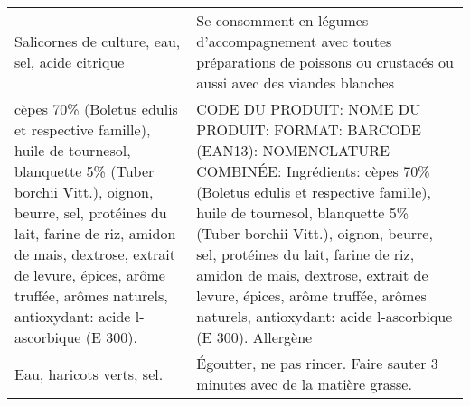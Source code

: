 \begin{longtable}{p{7cm}p{7cm}}
                                                                                                                                                                                                                                                        Salicornes de culture, eau, sel, acide citrique &                                                                                                                                                                                                                                                                                                                                          Se consomment en légumes d'accompagnement avec toutes préparations de poissons ou crustacés ou aussi avec des viandes blanches \\
        cèpes 70\% (Boletus edulis et respective famille), huile de tournesol, blanquette 5\% (Tuber borchii Vitt.), oignon, beurre, sel, protéines du lait, farine de riz, amidon de mais, dextrose, extrait de levure, épices, arôme truffée, arômes naturels, antioxydant: acide l-ascorbique (E 300). &  CODE DU PRODUIT:  \newline NOME DU PRODUIT:  \newline FORMAT:  \newline BARCODE (EAN13):  \newline NOMENCLATURE COMBINÉE:  \newline   \newline   \newline Ingrédients:  cèpes  70\%  (Boletus  edulis  et  respective  famille),  huile  de  tournesol,    blanquette  5\%  (Tuber  borchii  Vitt.),  \newline oignon,  beurre,  sel,  protéines  du  lait,  farine  de  riz,  amidon  de  mais,  dextrose,  extrait  de  levure,  épices,  arôme  truffée,  \newline arômes naturels, antioxydant: acide l-ascorbique (E 300).  \newline   \newline Allergène   \\
                                                                                                                                                                                                                                                                              Eau, haricots verts, sel. &                                                                                                                                                                                                                                                                                                                                                                                           Égoutter, ne pas \newline rincer. Faire sauter 3 \newline minutes avec de la \newline matière grasse. \\
\end{longtable}
